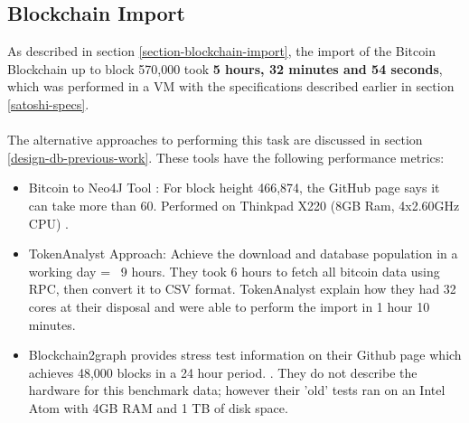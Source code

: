 \subsection{Blockchain Import}
As described in section \ref{section-blockchain-import}, the import of the Bitcoin Blockchain up to block 570,000 took \textbf{5 hours, 32 minutes and 54 seconds}, which was performed in a VM with the specifications described earlier in section \ref{satoshi-specs}.
\\\\
The alternative approaches to performing this task are discussed in section \ref{design-db-previous-work}. These tools have the following performance metrics:
\begin{itemize}
    \item Bitcoin to Neo4J Tool : For block height 466,874, the GitHub page says it can take more than 60. Performed on Thinkpad X220 (8GB Ram, 4x2.60GHz CPU) \cite{RefWorks:doc:5c98e031e4b068320632cef2}. 
    \item TokenAnalyst Approach: Achieve the download and database population in a working day = ~9 hours. They took 6 hours to fetch all bitcoin data using RPC, then convert it to CSV format. TokenAnalyst explain how they had 32 cores at their disposal and were able to perform the import in 1 hour 10 minutes. 
    \cite{RefWorks:doc:5c98e0cde4b044512c0b8641}
    \item Blockchain2graph provides stress test information on their Github page which achieves 48,000 blocks in a 24 hour period.  \cite{RefWorks:doc:5cac6184e4b01c076c63e173}. They do not describe the hardware for this benchmark data; however their 'old' tests ran on an Intel Atom with 4GB RAM and 1 TB of disk space. 
\end{itemize}

